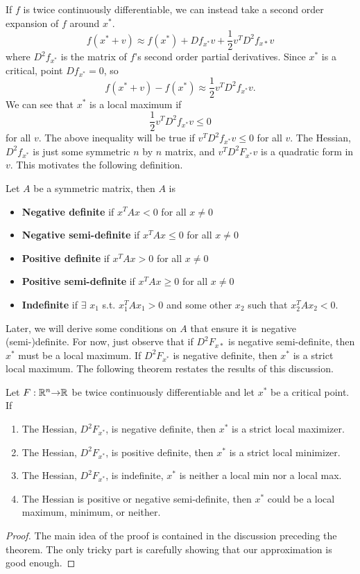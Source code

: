If $f$ is twice continuously differentiable, we can instead take a
second order expansion of $f$ around $x^*$.
\[ f(x^*+v) \approx f(x^*) + Df_{x^*} v + \frac{1}{2} v^T D^2 f_{x*}
v \] where $D^2 f_{x^*}$ is the matrix of $f$'s second order partial
derivatives.  Since $x^*$ is a critical, point $Df_{x^*} = 0$, so
\[ f(x^*+v) - f(x^*) \approx \frac{1}{2} v^T D^2 f_{x^*} v. \]
We can see that $x^*$ is a local maximum if 
\[ \frac{1}{2} v^T D^2 f_{x^*} v \leq 0 \] for all $v$. The above
inequality will be true if $v^T D^2 f_{x^*} v \leq 0$ for all $v$. The
Hessian, $D^2 f_{x^*}$ is just some symmetric $n$ by $n$ matrix, and
$v^T D^2 F_{x^*} v$ is a quadratic form in $v$. This motivates the
following definition.
\begin{definition}
  Let $A$ be a symmetric matrix, then $A$ is
  \begin{itemize}
  \item \textbf{Negative definite} if $x^T A x < 0$ for all $x \neq 0$
  \item \textbf{Negative semi-definite} if $x^T A x \leq 0$ for all $x \neq 0$
  \item \textbf{Positive definite} if $x^T A x > 0$ for all $x \neq 0$
  \item \textbf{Positive semi-definite} if $x^T A x \geq 0$ for all $x
    \neq 0$
  \item \textbf{Indefinite} if $\exists$ $x_1$ s.t. $x_1^T A x_1 > 0$ and
    some other $x_2$ such that $x_2^T A x_2 < 0$.
  \end{itemize}  
\end{definition}
Later, we will derive some conditions on $A$ that ensure it is
negative (semi-)definite. For now, just observe that if $D^2 F_{x*}$
is negative semi-definite, then $x^*$ must be a local maximum. If
$D^2F_{x^*}$ is negative definite, then $x^*$ is a strict local
maximum. The following theorem restates the results of this
discussion.
\begin{theorem}\label{thm:soc}
  Let $F: \mathbb{R}^n {\rightarrow} \mathbb{R}$ be twice continuously differentiable and
  let $x^*$ be a critical point. If
  \begin{enumerate}
  \item\label{c:smax} The Hessian, $D^2 F_{x^*}$, is negative definite,
    then $x^*$ is a strict local maximizer.  
  \item The Hessian, $D^2 F_{x^*}$, is positive definite, then $x^*$ is
    a strict local minimizer. 
  \item The Hessian, $D^2 F_{x^*}$, is indefinite, $x^*$ is neither a
    local min nor a local max.
  \item\label{c:ambig} The Hessian is positive or negative
    semi-definite, then $x^*$ could be a local maximum, minimum, or
    neither. 
  \end{enumerate}
\end{theorem}
\begin{proof}
  The main idea of the proof is contained in the discussion preceding
  the theorem. The only tricky part is carefully showing
  that our approximation is good enough. 
\end{proof}

